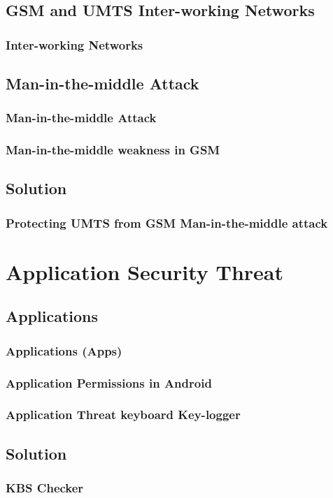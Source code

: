 \documentclass{beamer}
\begin{document}

\subsection{GSM and UMTS Inter-working Networks}
\begin{frame}
	\frametitle{Inter-working Networks}
\end{frame}
\subsection{Man-in-the-middle Attack}
\begin{frame}
		\frametitle{Man-in-the-middle Attack}
		\end{frame}
		
		
		
\begin{frame}
	\frametitle{Man-in-the-middle weakness in GSM}
\end{frame}
\subsection{Solution}
\begin{frame}
\frametitle{Protecting UMTS from GSM Man-in-the-middle attack}
\end{frame}
\section{Application Security Threat}
	\subsection{Applications}
		\begin{frame}
		\frametitle{Applications (Apps)}
		\end{frame}
		\begin{frame}
		\frametitle{Application Permissions in Android}
		\end{frame}
		\begin{frame}
		\frametitle{Application Threat keyboard Key-logger}
		\end{frame}
	\subsection{Solution}
		\begin{frame}
		\frametitle{KBS Checker}
		\end{frame}
\end{document}
